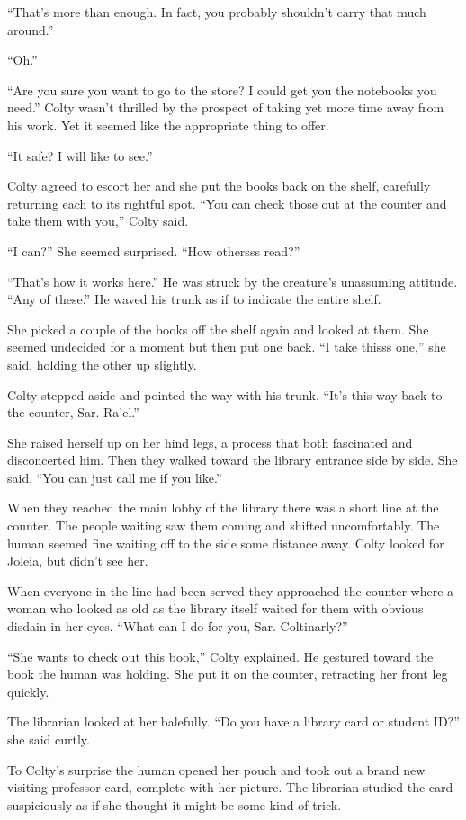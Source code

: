 ``That's more than enough. In fact, you probably shouldn't carry that much around.''

``Oh.''

``Are you sure you want to go to the store? I could get you the notebooks you need.'' Colty
wasn't thrilled by the prospect of taking yet more time away from his work. Yet it seemed like
the appropriate thing to offer.

``It safe? I will like to see.''

Colty agreed to escort her and she put the books back on the shelf, carefully returning each to
its rightful spot. ``You can check those out at the counter and take them with you,'' Colty
said.

``I can?'' She seemed surprised. ``How othersss read?''

``That's how it works here.'' He was struck by the creature's unassuming attitude. ``Any of
these.'' He waved his trunk as if to indicate the entire shelf.

She picked a couple of the books off the shelf again and looked at them. She seemed undecided
for a moment but then put one back. ``I take thisss one,'' she said, holding the other up
slightly.

Colty stepped aside and pointed the way with his trunk. ``It's this way back to the counter,
Sar. Ra'el.''

She raised herself up on her hind legs, a process that both fascinated and disconcerted him.
Then they walked toward the library entrance side by side. She said, ``You can just call me
 if you like.''

When they reached the main lobby of the library there was a short line at the counter. The
people waiting saw them coming and shifted uncomfortably. The human seemed fine waiting off to
the side some distance away. Colty looked for Joleia, but didn't see her.

When everyone in the line had been served they approached the counter where a woman who looked
as old as the library itself waited for them with obvious disdain in her eyes. ``What can I do
for you, Sar. Coltinarly?''

``She wants to check out this book,'' Colty explained. He gestured toward the book the human was
holding. She put it on the counter, retracting her front leg quickly.

The librarian looked at her balefully. ``Do you have a library card or student ID?'' she said
curtly.

To Colty's surprise the human opened her pouch and took out a brand new visiting professor card,
complete with her picture. The librarian studied the card suspiciously as if she thought it
might be some kind of trick.

